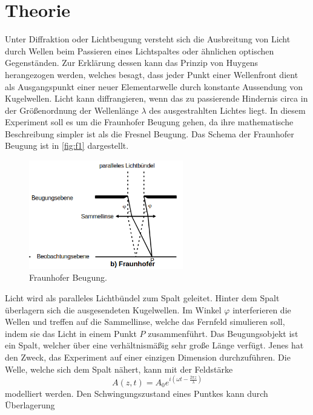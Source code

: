 \section{Theorie}
\label{sec:Theorie}

Unter Diffraktion oder Lichtbeugung versteht sich die Ausbreitung von Licht 
durch Wellen beim Passieren eines Lichtspaltes oder ähnlichen optischen 
Gegenständen. Zur Erklärung dessen kann das Prinzip von Huygens herangezogen 
werden, welches besagt, dass jeder Punkt einer Wellenfront dient als 
Ausgangspunkt einer neuer Elementarwelle durch konstante Aussendung von 
Kugelwellen. Licht kann diffrangieren, wenn das zu passierende Hindernis circa 
in der Größenordnung der Wellenlänge $\lambda$ des ausgestrahlten Lichtes 
liegt. In diesem Experiment soll es um die Fraunhofer Beugung gehen, da ihre 
mathematische Beschreibung simpler ist als die Fresnel Beugung. Das Schema 
der Fraunhofer Beugung ist in \autoref{fig:f1} dargestellt.
\begin{figure}[H]
    \centering
        \centering
        \includegraphics[width=0.6\textwidth]{Bilder/Fraunhoferschema.png}
        \caption{Fraunhofer Beugung. \cite{anleitung3}}
    \hfill
    \label{fig:f1}
\end{figure}
\noindent Licht wird als paralleles Lichtbündel zum Spalt geleitet. Hinter dem
Spalt überlagern sich die ausgesendeten Kugelwellen. Im Winkel $\varphi$ interferieren 
die Wellen und treffen auf die Sammellinse, welche das Fernfeld simulieren soll,
indem sie das Licht in einem Punkt $P$ zusammenführt.
\noindent Das Beugungsobjekt ist ein Spalt, welcher über eine verhältnismäßig
sehr große Länge verfügt. Jenes hat den Zweck, das Experiment auf einer einzigen 
Dimension durchzuführen. Die Welle, welche sich dem Spalt nähert, kann mit 
der Feldstärke
\begin{equation}
    \label{eqn:1}
    A(z,t) = A_0 e^{i\left(\omega t - \frac{2 \pi z}{\lambda}\right)}
\end{equation}
modelliert werden. Den Schwingungszustand eines Puntkes kann durch Überlagerung 
